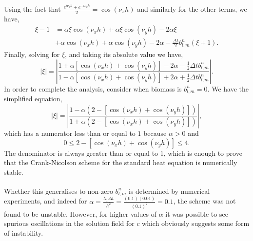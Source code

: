 Using the fact that $ \frac{e^{i \nu_x h}+  e^{-i \nu_x h}}{2} = \cos(\nu_x h)$ and similarly for
the other terms, we have,
\begin{equation*}
    \begin{split}
        \xi - 1 &=
         \alpha \xi \cos(\nu_x h) 
       + \alpha \xi \cos(\nu_y h) 
       -2 \alpha \xi   \\
       &+\alpha \cos(\nu_x h) 
       + \alpha \cos(\nu_y h) 
       -2 \alpha
       -\frac{\Delta t}{2} b_{l,m}^{n} (\xi + 1).
    \end{split}
\end{equation*}
Finally, solving for $\xi$, and taking its absolute value we have,
\begin{equation*}
    |\xi| = \left| \frac{1 + \alpha \left[ \cos(\nu_x h) + \cos(\nu_y h) \right] - 2 \alpha -\frac{1}{2} \Delta t b_{l,m}^{n} }
                        {1 -\alpha \left[ \cos(\nu_x h) + \cos(\nu_y h) \right]  + 2 \alpha +\frac{1}{2} \Delta t b_{l,m}^{n}} \right|.
\end{equation*}
In order to complete the analysis, consider when biomass is $b_{l,m}^{n} = 0$. We have the simplified
equation,
\begin{equation*}
    |\xi| = \left| \frac{1 -\alpha(2 - \left[ \cos(\nu_x h) + \cos(\nu_y h) \right]) }
                        {1 +\alpha(2 - \left[ \cos(\nu_x h) + \cos(\nu_y h)\right])} \right|,
\end{equation*}
which has a numerator less than or equal to $1$ because $\alpha > 0$ and 
\begin{equation*}
0 \leq 2 - \left[ \cos(\nu_x h) + \cos(\nu_y h) \right] \leq 4.
\end{equation*}
The denominator is 
always greater than or equal to $1$, which is enough to prove that
the Crank-Nicolson scheme for the standard heat equation is numerically stable.
\\
\\
Whether this generalises to non-zero $b_{l,m}^{n}$ is determined by numerical experiments, and 
indeed for $\alpha = \frac{\lambda_1 \Delta t}{h^2} = \frac{(0.1) (0.01)}{(0.1)^2} = 0.1$, the scheme 
was not found to be unstable. However, for higher values of $\alpha$ it was possible to see spurious 
oscillations in the solution field for $c$ which obviously suggests some form of instability.





